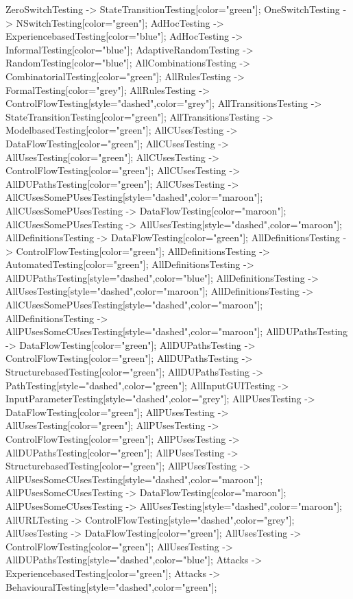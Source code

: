 \documentclass{article}
\begin{document}
{ZeroSwitchTesting -> StateTransitionTesting[color="green"];
OneSwitchTesting -> NSwitchTesting[color="green"];
AdHocTesting -> ExperiencebasedTesting[color="blue"];
AdHocTesting -> InformalTesting[color="blue"];
AdaptiveRandomTesting -> RandomTesting[color="blue"];
AllCombinationsTesting -> CombinatorialTesting[color="green"];
AllRulesTesting -> FormalTesting[color="grey"];
AllRulesTesting -> ControlFlowTesting[style="dashed",color="grey"];
AllTransitionsTesting -> StateTransitionTesting[color="green"];
AllTransitionsTesting -> ModelbasedTesting[color="green"];
AllCUsesTesting -> DataFlowTesting[color="green"];
AllCUsesTesting -> AllUsesTesting[color="green"];
AllCUsesTesting -> ControlFlowTesting[color="green"];
AllCUsesTesting -> AllDUPathsTesting[color="green"];
AllCUsesTesting -> AllCUsesSomePUsesTesting[style="dashed",color="maroon"];
AllCUsesSomePUsesTesting -> DataFlowTesting[color="maroon"];
AllCUsesSomePUsesTesting -> AllUsesTesting[style="dashed",color="maroon"];
AllDefinitionsTesting -> DataFlowTesting[color="green"];
AllDefinitionsTesting -> ControlFlowTesting[color="green"];
AllDefinitionsTesting -> AutomatedTesting[color="green"];
AllDefinitionsTesting -> AllDUPathsTesting[style="dashed",color="blue"];
AllDefinitionsTesting -> AllUsesTesting[style="dashed",color="maroon"];
AllDefinitionsTesting -> AllCUsesSomePUsesTesting[style="dashed",color="maroon"];
AllDefinitionsTesting -> AllPUsesSomeCUsesTesting[style="dashed",color="maroon"];
AllDUPathsTesting -> DataFlowTesting[color="green"];
AllDUPathsTesting -> ControlFlowTesting[color="green"];
AllDUPathsTesting -> StructurebasedTesting[color="green"];
AllDUPathsTesting -> PathTesting[style="dashed",color="green"];
AllInputGUITesting -> InputParameterTesting[style="dashed",color="grey"];
AllPUsesTesting -> DataFlowTesting[color="green"];
AllPUsesTesting -> AllUsesTesting[color="green"];
AllPUsesTesting -> ControlFlowTesting[color="green"];
AllPUsesTesting -> AllDUPathsTesting[color="green"];
AllPUsesTesting -> StructurebasedTesting[color="green"];
AllPUsesTesting -> AllPUsesSomeCUsesTesting[style="dashed",color="maroon"];
AllPUsesSomeCUsesTesting -> DataFlowTesting[color="maroon"];
AllPUsesSomeCUsesTesting -> AllUsesTesting[style="dashed",color="maroon"];
AllURLTesting -> ControlFlowTesting[style="dashed",color="grey"];
AllUsesTesting -> DataFlowTesting[color="green"];
AllUsesTesting -> ControlFlowTesting[color="green"];
AllUsesTesting -> AllDUPathsTesting[style="dashed",color="blue"];
Attacks -> ExperiencebasedTesting[color="green"];
Attacks -> BehaviouralTesting[style="dashed",color="green"];
}
\end{document}
